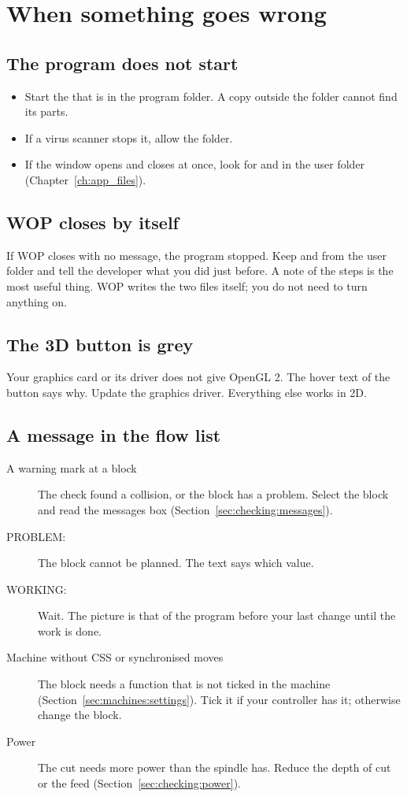 \chapter{When something goes wrong}\label{ch:troubleshooting}

\section{The program does not start}
\begin{itemize}
  \item Start the  that is in the program folder. A copy outside the folder cannot find its parts.
  \item If a virus scanner stops it, allow the folder.
  \item If the window opens and closes at once, look for  and  in the user folder (Chapter~\ref{ch:app_files}).
\end{itemize}

\section{WOP closes by itself}
If WOP closes with no message, the program stopped. Keep  and  from the user folder and tell the developer what you did just before. A note of the steps is the most useful thing. WOP writes the two files itself; you do not need to turn anything on.

\section{The 3D button is grey}
Your graphics card or its driver does not give OpenGL 2. The hover text of the button says why. Update the graphics driver. Everything else works in 2D.

\section{A message in the flow list}
\begin{description}
\item[A warning mark at a block] The check found a collision, or the block has a problem. Select the block and read the messages box (Section~\ref{sec:checking:messages}).
\item[\textsf{PROBLEM:}] The block cannot be planned. The text says which value.
\item[\textsf{WORKING:}] Wait. The picture is that of the program before your last change until the work is done.
\item[Machine without CSS or synchronised moves] The block needs a function that is not ticked in the machine (Section~\ref{sec:machines:settings}). Tick it if your controller has it; otherwise change the block.
\item[Power] The cut needs more power than the spindle has. Reduce the depth of cut or the feed (Section~\ref{sec:checking:power}).
\end{description}

